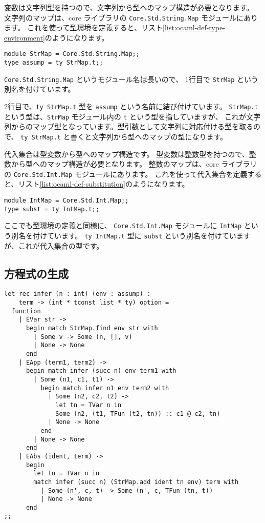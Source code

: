 変数は文字列型を持つので、文字列から型へのマップ構造が必要となります。
文字列のマップは、core ライブラリの \texttt{Core.Std.String.Map} モジュールにあります。
これを使って型環境を定義すると、リスト\ref{list:ocaml-def-type-environment}のようになります。

\begin{lstlisting}[caption=型環境の定義, label=list:ocaml-def-type-environment]
module StrMap = Core.Std.String.Map;;
type assump = ty StrMap.t;;
\end{lstlisting}

\texttt{Core.Std.String.Map} というモジュール名は長いので、
1行目で \texttt{StrMap} という別名を付けています。

2行目で、\texttt{ty StrMap.t} 型を \texttt{assump} という名前に結び付けています。
\texttt{StrMap.t} という型は、\texttt{StrMap} モジュール内の \texttt{t} という型を指していますが、
これが文字列からのマップ型となっています。型引数として文字列に対応付ける型を取るので、
\texttt{ty StrMap.t} と書くと文字列から型へのマップの型になります。

代入集合は型変数から型へのマップ構造です。
型変数は整数型を持つので、整数から型へのマップ構造が必要となります。
整数のマップは、core ライブラリの \texttt{Core.Std.Int.Map} モジュールにあります。
これを使って代入集合を定義すると、リスト\ref{list:ocaml-def-substitution}のようになります。

\begin{lstlisting}[caption=代入集合の定義, label=list:ocaml-def-substitution]
module IntMap = Core.Std.Int.Map;;
type subst = ty IntMap.t;;
\end{lstlisting}

ここでも型環境の定義と同様に、
\texttt{Core.Std.Int.Map} モジュールに \texttt{IntMap} という別名を付けています。
\texttt{ty IntMap.t} 型に \texttt{subst} という別名を付けていますが、これが代入集合の型です。

\subsection{方程式の生成}

\begin{lstlisting}[caption=方程式を生成する関数, label=list:ocaml-stlc-infer]
let rec infer (n : int) (env : assump) :
    term -> (int * tconst list * ty) option =
  function
    | EVar str ->
      begin match StrMap.find env str with
        | Some v -> Some (n, [], v)
        | None -> None
      end
    | EApp (term1, term2) ->
      begin match infer (succ n) env term1 with
        | Some (n1, c1, t1) ->
          begin match infer n1 env term2 with
            | Some (n2, c2, t2) ->
              let tn = TVar n in
              Some (n2, (t1, TFun (t2, tn)) :: c1 @ c2, tn)
            | None -> None
          end
        | None -> None
      end
    | EAbs (ident, term) ->
      begin
        let tn = TVar n in
        match infer (succ n) (StrMap.add ident tn env) term with
          | Some (n', c, t) -> Some (n', c, TFun (tn, t))
          | None -> None
      end
;;
\end{lstlisting}

